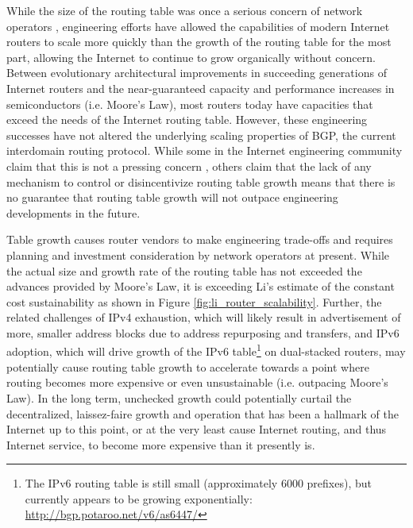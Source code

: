 While the size of the routing table was once a serious concern of network operators , engineering efforts have allowed the capabilities of modern Internet routers to scale more quickly than the growth of the routing table for the most part, allowing the Internet to continue to grow organically without concern. Between evolutionary architectural improvements in succeeding generations of Internet routers \cite{McKeown:2006kx} and the near-guaranteed capacity and performance increases in semiconductors (i.e. Moore's Law), most routers today have capacities that exceed the needs of the Internet routing table. However, these engineering successes have not altered the underlying scaling properties of BGP, the current interdomain routing protocol. While some in the Internet engineering community claim that this is not a pressing concern \cite{Huston:2011ys, Huston:2009dq}, others \cite{Li:2011vn} claim that the lack of any mechanism to control or disincentivize routing table growth means that there is no guarantee that routing table growth will not outpace engineering developments in the future.

Table growth causes router vendors to make engineering trade-offs \cite{Li:2011vn, Fall:2009fk} and requires planning and investment consideration by network operators \cite{Zhao:2010fu} at present. While the actual size and growth rate of the routing table has not exceeded the advances provided by Moore's Law, it is exceeding Li's estimate of the constant cost sustainability as shown in Figure \ref{fig:li_router_scalability}. Further, the related challenges of IPv4 exhaustion, which will likely result in advertisement of more, smaller address blocks due to address repurposing and transfers, and IPv6 adoption, which will drive growth of the IPv6 table\footnote{The IPv6 routing table is still small (approximately 6000 prefixes), but currently appears to be growing exponentially: \url{http://bgp.potaroo.net/v6/as6447/}} on dual-stacked routers, may potentially cause routing table growth to accelerate towards a point where routing becomes more expensive or even unsustainable (i.e. outpacing Moore's Law). In the long term, unchecked growth could potentially curtail the decentralized, laissez-faire growth and operation that has been a hallmark of the Internet up to this point, or at the very least cause Internet routing, and thus Internet service, to become more expensive than it presently is.

